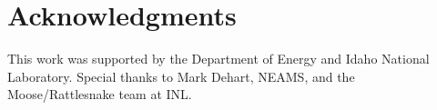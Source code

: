 \documentclass{anstrans}
\begin{document}
\section{Acknowledgments}

This work was supported by the Department of Energy and Idaho National Laboratory.  Special thanks to Mark Dehart, NEAMS, and the Moose/Rattlesnake team at INL.



\end{document}
